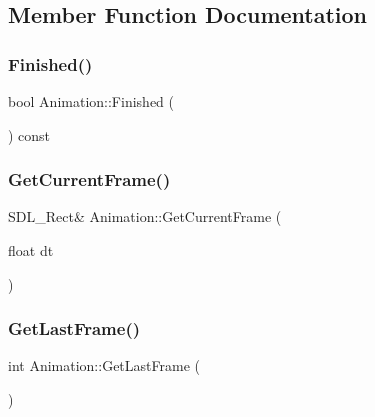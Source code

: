 \subsection{Member Function Documentation}
\mbox{\label{class_animation_a792f854c907ce8ff6124d52aaad29277}} 
\subsubsection{\texorpdfstring{Finished()}{Finished()}}
{\footnotesize\ttfamily bool Animation\+::\+Finished (\begin{DoxyParamCaption}{ }\end{DoxyParamCaption}) const\hspace{0.3cm}{\ttfamily [inline]}}

\mbox{\label{class_animation_a5d5417269b6065e251830ff1b8eaaf7e}} 
\subsubsection{\texorpdfstring{GetCurrentFrame()}{GetCurrentFrame()}}
{\footnotesize\ttfamily S\+D\+L\+\_\+\+Rect\& Animation\+::\+Get\+Current\+Frame (\begin{DoxyParamCaption}\item[{float}]{dt }\end{DoxyParamCaption})\hspace{0.3cm}{\ttfamily [inline]}}

\mbox{\label{class_animation_af2eaa1fed2dd359a1aa1743e204e9b30}} 
\subsubsection{\texorpdfstring{GetLastFrame()}{GetLastFrame()}}
{\footnotesize\ttfamily int Animation\+::\+Get\+Last\+Frame (\begin{DoxyParamCaption}{ }\end{DoxyParamCaption})\hspace{0.3cm}{\ttfamily [inline]}}

